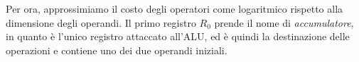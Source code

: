 \documentclass[a4paper]{article}
\begin{document}
Per ora, approssimiamo il costo degli operatori come logaritmico rispetto alla dimensione
degli operandi. Il primo registro \(R_0\) prende il nome di \emph{accumulatore},
in quanto è l'unico registro attaccato all'ALU, ed è quindi la destinazione delle operazioni e
contiene uno dei due operandi iniziali.



\end{document}
